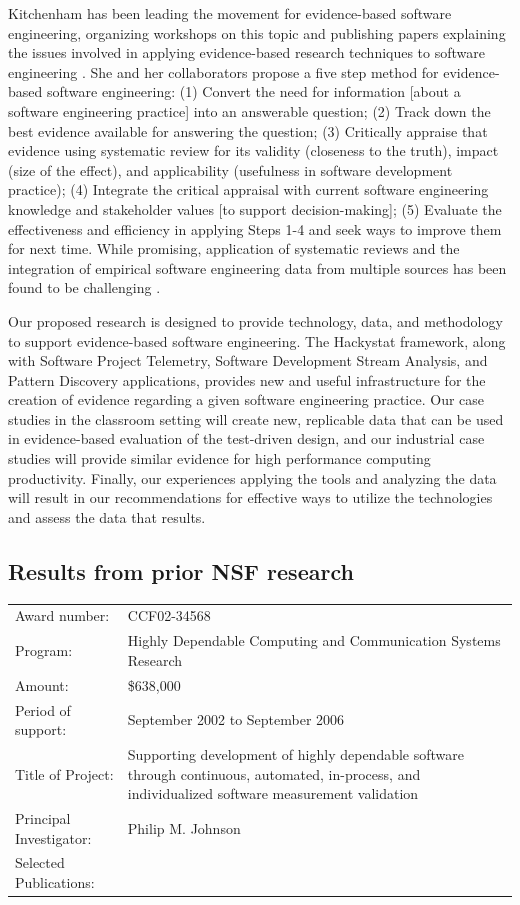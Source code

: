 Kitchenham has been leading the movement for evidence-based software
engineering, organizing workshops on this topic and publishing papers
explaining the issues involved in applying evidence-based research
techniques to software engineering \cite{Kitchenham04,Kitchenham04a}.  She
and her collaborators propose a five step method for evidence-based
software engineering: (1) Convert the need for information [about a
software engineering practice] into an answerable question; (2) Track down
the best evidence available for answering the question; (3) Critically
appraise that evidence using systematic review for its validity (closeness
to the truth), impact (size of the effect), and applicability (usefulness
in software development practice); (4) Integrate the critical appraisal
with current software engineering knowledge and stakeholder values [to
support decision-making]; (5) Evaluate the effectiveness and efficiency in
applying Steps 1-4 and seek ways to improve them for next time.  While
promising, application of systematic reviews and the integration of
empirical software engineering data from multiple sources has been found to
be challenging \cite{Jedlitschka04}.

Our proposed research is designed to provide technology, data, and
methodology to support evidence-based software engineering.  The Hackystat
framework, along with Software Project Telemetry, Software Development
Stream Analysis, and Pattern Discovery applications, provides new and useful
infrastructure for the creation of evidence regarding a given software
engineering practice. Our case studies in the classroom setting will create
new, replicable data that can be used in evidence-based evaluation of the
test-driven design, and our industrial case studies will provide similar
evidence for high performance computing productivity.  Finally, our
experiences applying the tools and analyzing the data will result in our
recommendations for effective ways to utilize the technologies and assess
the data that results.

\subsection{Results from prior NSF research}

\small
\begin{tabular}{lp{4.5in}}

Award number: & CCF02-34568 \\
Program: & Highly Dependable Computing and Communication Systems Research\\
Amount: & \$638,000 \\
Period of support: & September 2002 to September 2006 \\
Title of Project: & Supporting development of highly dependable software through
continuous, automated, in-process, and individualized software measurement validation \\
Principal Investigator: & Philip M. Johnson \\
Selected Publications: & \cite{csdl2-04-22,csdl2-04-13,csdl2-04-11,csdl2-03-12,
csdl2-02-07,csdl2-03-07,csdl2-04-02,csdl2-04-04,csdl2-04-06}
\end{tabular} \\ %
\normalsize

